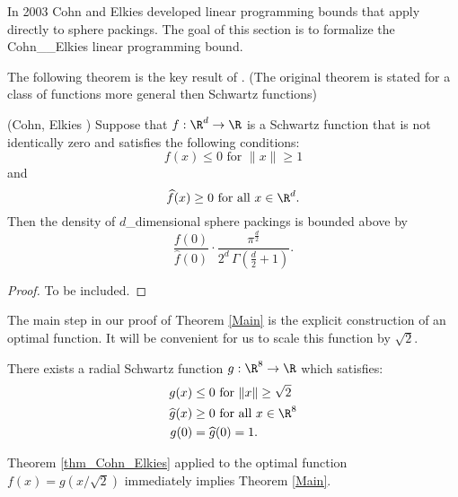 In 2003 Cohn and Elkies \cite{ElkiesCohn}  developed  linear programming bounds that apply directly to sphere packings. The goal of this section is to formalize the Cohn__Elkies linear programming bound.

The following theorem is the key result of \cite{ElkiesCohn}. (The original theorem is stated for a   class of functions more general then Schwartz functions)
\begin{theorem}\label{thm_Cohn_Elkies}\notready
(Cohn, Elkies \cite{ElkiesCohn}) Suppose that  $f:\R^d\to\R$ is a Schwartz function that is not identically zero and satisfies the following conditions:
\begin{equation}\label{eqn_Cohn_Elkies_condition_1}f(x)\leq 0\mbox{ for } \|x\|\geq 1\end{equation} and
\begin{equation}\label{eqn_Cohn_Elkies_condition_2}\widehat{f}(x)\geq0\mbox{ for all } x\in\R^d.\end{equation}
  Then the density of $d$_dimensional
  sphere packings is bounded above by $$\frac{f(0)}{\widehat{f}(0)}\cdot \frac{\pi^{\frac{d}{2}}}{2^d\,\Gamma(\textstyle \frac{d}{2}+1)}.$$
\end{theorem}
\begin{proof}
To be included.
\end{proof}

The main step in our proof of Theorem \ref{Main} is the explicit  construction of an optimal function. It will be convenient for us to scale this function by $\sqrt{2}$.
\begin{theorem}\label{thm_g}
There exists a radial Schwartz function $g:\R^8\to\R$ which satisfies:
\begin{align}
g(x)&\leq 0\mbox{ for } \|x\|\geq \sqrt{2} \label{eqn_g1}\\
\widehat{g}(x)&\geq0\mbox{ for all } x\in\R^8\label{eqn_g2}\\
g(0)&=\widehat{g}(0)=1.\label{eqn_g3}
\end{align}
\end{theorem}
Theorem \ref{thm_Cohn_Elkies} applied to the optimal function $f(x)=g(x/\sqrt{2})$ immediately implies Theorem \ref{Main}.
